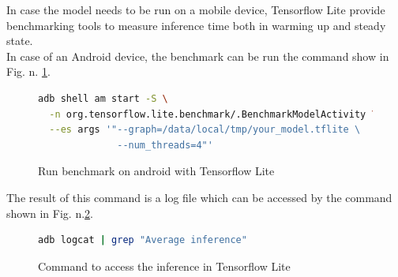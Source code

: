 In case the model needs to be run on a mobile device, Tensorflow Lite provide benchmarking tools to measure inference time both in warming up and steady state.\cite{tensorflow2015-whitepaper}\\ 
In case of an Android device, the benchmark can be run the command show in Fig. n. \ref{fig:bench_ten_lite_an}.\\
\begin{figure}[h]
\begin{lstlisting}[language=bash]
adb shell am start -S \
  -n org.tensorflow.lite.benchmark/.BenchmarkModelActivity \
  --es args '"--graph=/data/local/tmp/your_model.tflite \
              --num_threads=4"'
\end{lstlisting}
\caption[Run benchmark on android with Tensorflow Lite]{Run benchmark on android with Tensorflow Lite \cite{tensorflow2015-whitepaper}}
\label{fig:bench_ten_lite_an}
\end{figure}
The result of this command is a log file which can be accessed by the command shown in Fig. n.\ref{fig:inf_ten}.\\
\begin{figure}[h]
\begin{lstlisting}[language=bash]
adb logcat | grep "Average inference"
\end{lstlisting}
\caption[Command to access the inference in Tensorflow Lite]{Command to access the inference in Tensorflow Lite\cite{tensorflow2015-whitepaper}}
\label{fig:inf_ten}
\end{figure}



